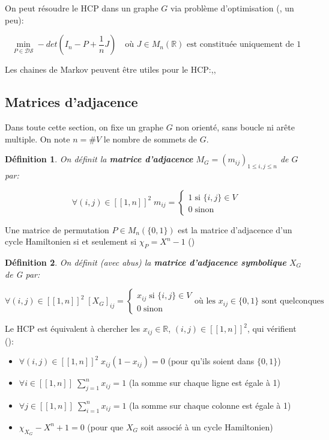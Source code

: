 \documentclass{article}
\newtheorem{definition}{Définition}[section]
\begin{document}
On peut résoudre le HCP dans un graphe $G$  via problème d'optimisation (\cite{Haythorpe2010FindingHC,Ejov2008DeterminantsAL}, un peu\cite{Ejov2009ConsistentBO}):

\[
\min_{P \in \mathcal{D}\mathcal{S}} -det(I_{n}-P+\frac{1}{n}J) \quad \text{où $J \in M_{n}(\mathbb{R})$ est constituée uniquement de 1}
\]

Les chaines de Markov peuvent être utiles pour le HCP:\cite{Haythorpe2013MarkovCB},\cite{Ejov2009ConsistentBO},\cite{Filar2007ControlledMC}


\subsection{Matrices d'adjacence}
Dans toute cette section, on fixe un graphe $G$ non orienté, sans boucle ni arête multiple. On note $n=\# V$ le nombre de sommets de $G$.

\begin{definition}
On définit la \textbf{matrice d'adjacence} $M_G=(m_{ij})_{1 \le i,j \le n}$ de $G$ par:

\[
\forall (i,j) \in [\![1,n]\!]^2 \; m_{ij}=
	\begin{cases}
	1 \; \text{si $\{i,j\} \in V$}\\
	0 \; \text{sinon}
	\end{cases}
\]
\end{definition}

Une matrice de permutation $P \in M_{n}(\{0,1\})$ est la matrice d'adjacence d'un cycle Hamiltonien si et seulement si $\chi _{P} = X^{n}-1$ (\cite{Ejov2006SOLVINGTH})

\begin{definition}
On définit (avec abus) la \textbf{matrice d'adjacence symbolique} $X_{G}$ de G par:

\[
\forall (i,j) \in [\![1,n]\!]^2 \; [X_{G}]_{ij}=
	\begin{cases}
	x_{ij} \; \text{si $\{i,j\} \in V$}\\
	0 \; \text{sinon}
	\end{cases}
\text{où les $x_{ij} \in \{0,1\}$ sont quelconques}
\]
\end{definition}

Le HCP est équivalent à chercher les $x_{ij} \in \mathbb{R}$, $(i,j) \in [\![1,n]\!]^2$, qui vérifient (\cite{Ejov2006SOLVINGTH}):

\begin{itemize}
\item $\forall (i,j) \in [\![1,n]\!]^2 \; x_{ij}(1-x_{ij})=0$ \quad (pour qu'ils soient dans $\{0,1\}$)
\item $\forall i \in [\![1,n]\!] \; \sum\limits_{j=1}^{n}x_{ij}=1$ \quad (la somme sur chaque ligne est égale à 1)
\item $\forall j \in [\![1,n]\!] \; \sum\limits_{i=1}^{n}x_{ij}=1$ \quad (la somme sur chaque colonne est égale à 1)
\item $\chi_{X_{G}} - X^{n}+1=0$ \quad (pour que $X_{G}$ soit associé à un cycle Hamiltonien)
\end{itemize}
\end{document}
